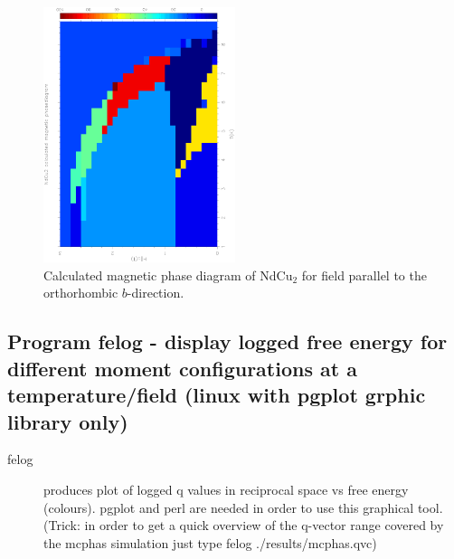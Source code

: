 \begin{figure}[hb]%
\begin{center}\leavevmode
\includegraphics[angle=-90, width=0.5\textwidth]{../examples/ndcu2b/resultss/phased.ps}
\end{center}
\caption{Calculated magnetic phase diagram of NdCu$_2$ for field parallel to the orthorhombic $b$-direction.}
\label{phasediagramgraphic}
\end{figure}
\clearpage


\subsection{Program {\prg felog} - display logged free energy for different moment configurations %
at a temperature/field (linux with pgplot grphic library only)}

\begin{description} 
\item [felog]                  produces plot of logged q values in reciprocal
space vs free energy (colours). {\prg pgplot} and {\prg perl} are needed in order
to use this graphical tool.
(Trick: in order to get a quick overview of the
q-vector range covered by the mcphas simulation just type {\prg felog ./results/mcphas.qvc})
\end{description} 


